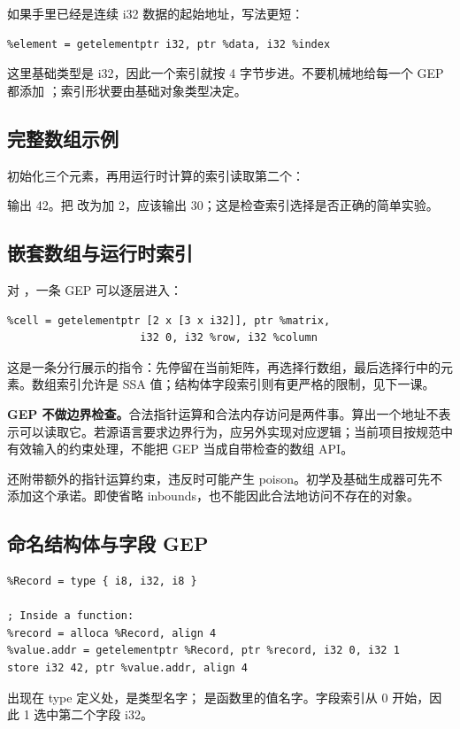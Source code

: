 如果手里已经是连续 i32 数据的起始地址，写法更短：
\begin{lstlisting}
%element = getelementptr i32, ptr %data, i32 %index
\end{lstlisting}
这里基础类型是 i32，因此一个索引就按 4 字节步进。不要机械地给每一个 GEP 都添加 ；索引形状要由基础对象类型决定。

\subsection{完整数组示例}
 初始化三个元素，再用运行时计算的索引读取第二个：

输出 42。把  改为加 2，应该输出 30；这是检查索引选择是否正确的简单实验。

\subsection{嵌套数组与运行时索引}
对 \code{[2 x [3 x i32]]}，一条 GEP 可以逐层进入：
\begin{lstlisting}
%cell = getelementptr [2 x [3 x i32]], ptr %matrix,
                     i32 0, i32 %row, i32 %column
\end{lstlisting}
这是一条分行展示的指令：先停留在当前矩阵，再选择行数组，最后选择行中的元素。数组索引允许是 SSA 值；结构体字段索引则有更严格的限制，见下一课。

\textbf{GEP 不做边界检查。}合法指针运算和合法内存访问是两件事。算出一个地址不表示可以读取它。若源语言要求边界行为，应另外实现对应逻辑；当前项目按规范中有效输入的约束处理，不能把 GEP 当成自带检查的数组 API。

 还附带额外的指针运算约束，违反时可能产生 poison。初学及基础生成器可先不添加这个承诺。即使省略 inbounds，也不能因此合法地访问不存在的对象。



\subsection{命名结构体与字段 GEP}
\begin{lstlisting}
%Record = type { i8, i32, i8 }

; Inside a function:
%record = alloca %Record, align 4
%value.addr = getelementptr %Record, ptr %record, i32 0, i32 1
store i32 42, ptr %value.addr, align 4
\end{lstlisting}
 出现在 type 定义处，是类型名字； 是函数里的值名字。字段索引从 0 开始，因此 1 选中第二个字段 i32。

